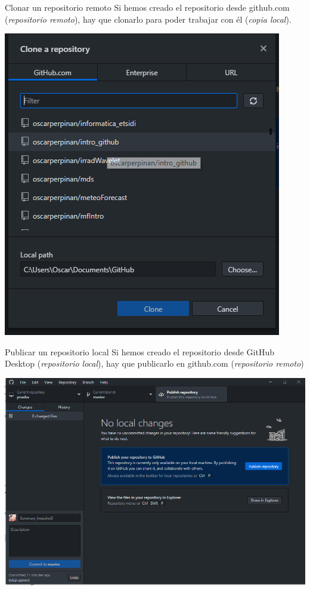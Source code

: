 \documentclass[xcolor={usenames,svgnames,dvipsnames}]{beamer}
\begin{document}
\begin{frame}[label={sec:orgf3aec4c}]{Clonar un repositorio remoto}
Si hemos creado el repositorio desde github.com (\emph{repositorio remoto}), hay que clonarlo para poder trabajar con él (\emph{copia local}).

\begin{center}
\end{center}

\begin{center}
\includegraphics[height=0.65\textheight]{figs/Desktop_CloneRepository.png}
\end{center}
\end{frame}

\begin{frame}[label={sec:org8b6ac78}]{Publicar un repositorio local}
Si hemos creado el repositorio desde GitHub Desktop (\emph{repositorio local}), hay que publicarlo en github.com (\emph{repositorio remoto})

\begin{center}
\includegraphics[width=.9\linewidth]{figs/Desktop_PublishRepository.png}
\end{center}
\end{frame}
\end{document}
